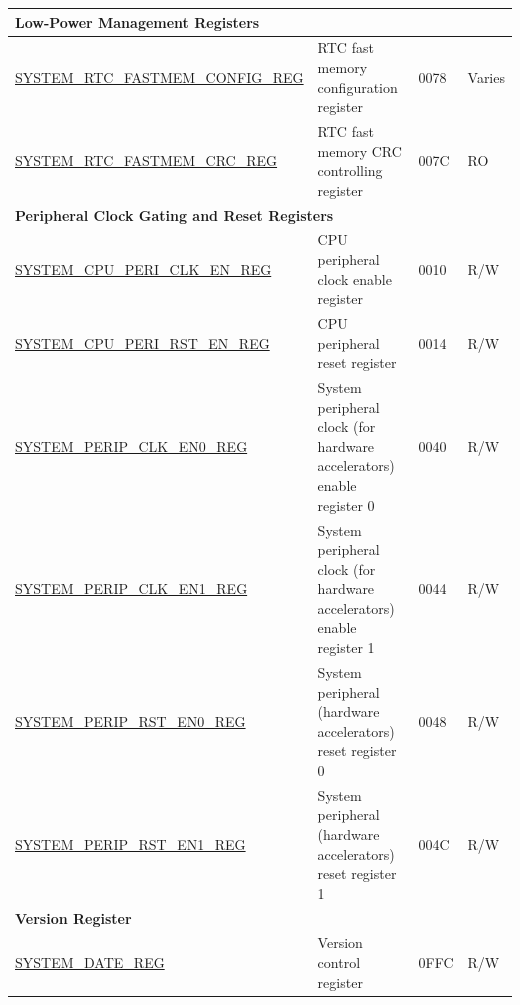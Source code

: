 \begin{longtable}{ | p{6.5cm} | p{7.5cm} | p{1.3cm} | p{1cm} | }
\multicolumn{4}{|l|}{\textbf{Low-Power Management Registers}} \\ \hline
\hyperref[regdesc:SYSTEMRTCFASTMEMCONFIGREG]{SYSTEM\_RTC\_FASTMEM\_CONFIG\_REG} & RTC fast memory configuration register & \hexprefix{}0078 & Varies \\ \hline
\hyperref[regdesc:SYSTEMRTCFASTMEMCRCREG]{SYSTEM\_RTC\_FASTMEM\_CRC\_REG} & RTC fast memory CRC controlling register & \hexprefix{}007C & RO \\ \hline

\multicolumn{4}{|l|}{\textbf{Peripheral Clock Gating and Reset Registers}} \\ \hline
\hyperref[regdesc:SYSTEMCPUPERICLKENREG]{SYSTEM\_CPU\_PERI\_CLK\_EN\_REG} & CPU peripheral clock enable register & \hexprefix{}0010 & R/W \\ \hline
\hyperref[regdesc:SYSTEMCPUPERIRSTENREG]{SYSTEM\_CPU\_PERI\_RST\_EN\_REG} & CPU peripheral reset register & \hexprefix{}0014 & R/W \\ \hline
\hyperref[regdesc:SYSTEMPERIPCLKEN0REG]{SYSTEM\_PERIP\_CLK\_EN0\_REG} & System peripheral clock (for hardware accelerators) enable register 0 & \hexprefix{}0040 & R/W \\ \hline
\hyperref[regdesc:SYSTEMPERIPCLKEN1REG]{SYSTEM\_PERIP\_CLK\_EN1\_REG} & System peripheral clock  (for hardware accelerators) enable register 1 & \hexprefix{}0044 & R/W \\ \hline
\hyperref[regdesc:SYSTEMPERIPRSTEN0REG]{SYSTEM\_PERIP\_RST\_EN0\_REG} & System peripheral (hardware accelerators) reset register 0 & \hexprefix{}0048 & R/W \\ \hline
\hyperref[regdesc:SYSTEMPERIPRSTEN1REG]{SYSTEM\_PERIP\_RST\_EN1\_REG} & System peripheral (hardware accelerators) reset register 1 & \hexprefix{}004C & R/W \\ \hline







\multicolumn{4}{|l|}{\textbf{Version Register}} \\ \hline
\hyperref[regdesc:SYSTEMREGDATEREG]{SYSTEM\_DATE\_REG} & Version control register & \hexprefix{}0FFC & R/W \\ \hline
\end{longtable}
